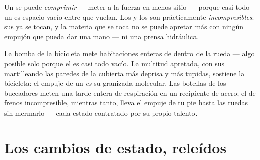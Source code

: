 \begin{proposition}\label{prop:g7:states-of-matter:squeeze}
Un  se puede \emph{comprimir} --- meter a la
fuerza en menos sitio --- porque casi todo un  es espacio vacío
entre  que vuelan. Los  y los 
son prácticamente \emph{incompresibles}: sus  ya se
tocan, y la materia que se toca no se puede apretar más con ningún
empujón que pueda dar una mano --- ni una prensa hidráulica.
\end{proposition}

\begin{example}\label{ex:g7:states-of-matter:squeezed}
La bomba de la bicicleta mete habitaciones enteras de  dentro de
la rueda --- algo posible solo porque el  es casi todo vacío. La
multitud apretada, con sus  martilleando las paredes de la
cubierta más deprisa y más tupidas, sostiene la bicicleta: el empuje
de un  \emph{es} su granizada molecular. Las botellas de los
buceadores meten una tarde entera de respiración en un recipiente de
acero; el  de frenos incompresible, mientras tanto, lleva el
empuje de tu pie hasta las ruedas sin mermarlo --- cada estado
contratado por su propio talento.
\end{example}

\section{Los cambios de estado, releídos}

